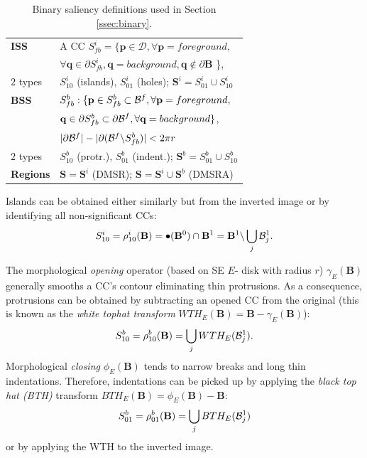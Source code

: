 \documentclass[conference,compsoc]{IEEEtran}
\newcommand {\be}{\begin{equation}}
\newcommand {\ee}{\end{equation}}
\def\B{{\mathbf B}}
\def\mcD{{\mathcal{D}}}
\def\p{{\mathbf p}}
\def\q{{\mathbf q}}
\def\S{{\mathbf S}}
\begin{document}
\begin{table}[hbt]
\caption{Binary saliency definitions used in Section \ref{ssec:binary}.}\label{table:binary_sal}
\begin{minipage}[b]{0.99\linewidth}\begin{tabular}{|l l|}
\hline
{\bf ISS} & A CC $S^i_{fb} = \{\p \in \mcD, \forall \p=foreground,$\\&$\forall \q \in \partial S^i_{fb}, \q=background, \q \notin \partial \B $ \},\\
$2$ types & $S^i_{10}$ (islands), $S^i_{01}$  (holes); $\S^i = S_{01}^i \cup S_{10}^i$\\
{\bf BSS} &  $S_{fb}^b: \{\p \in S_{fb}^b \subset{\cal B}^f, \forall \p = foreground,$\\&$ \q \in \partial S_{fb}^b \subset {\partial \cal B}^f,\forall \q = background \}$, \\
& $|\partial {\cal B}^f| - |\partial ({\cal B}^f \backslash S_{fb}^b)| < 2 \pi r$\\
$2$ types & $S^b_{10}$ (protr.), $S^b_{01}$ (indent.); $\S^b = S_{01}^b \cup S_{10}^b$\\
{\bf Regions} &  $\S = \S^i$ (DMSR); $\S = \S^i \cup \S^b$ (DMSRA)  \\
\hline
\end{tabular}
\centering
\end{minipage}
\end{table}

Islands can be obtained either similarly but from the inverted image or by identifying all non-significant CCs:
\be
S^i_{10} = \rho^i_{10}(\B)= \bullet(\B ^0) \cap \B^1 = \B^1 \backslash \bigcup_j{{\cal B}_j^1} \label{eqn:sal:inn:10}.
\ee

The morphological {\em opening} operator (based on SE
$E$- disk with radius $r$)  $\gamma_E(\B)$ generally smooths a CC's contour 
eliminating thin protrusions. As a consequence, protrusions can be obtained by subtracting an opened CC from the original (this is known as the {\it white tophat
transform} $WTH_E(\B) = \B - \gamma_E(\B)$):
\be
S^b_{10} = \rho^b_{10}(\B)=   \bigcup_j WTH_E({\cal B}_j^1) \label{eqn:sal:bor:10}.
\ee
Morphological {\em closing} $\phi_{E}(\B)$ tends to narrow breaks and long thin indentations.
Therefore, indentations can be picked up by applying the {\em black top hat (BTH)} transform  $BTH_E(\B) = \phi_E(\B) - \B$:
\be
S^b_{01} = \rho^b_{01}(\B)=  \bigcup_j BTH_E({\cal B}_j^1) \label{eqn:sal:bor:01}
\ee
or by applying the WTH to the inverted image.
\end{document}
